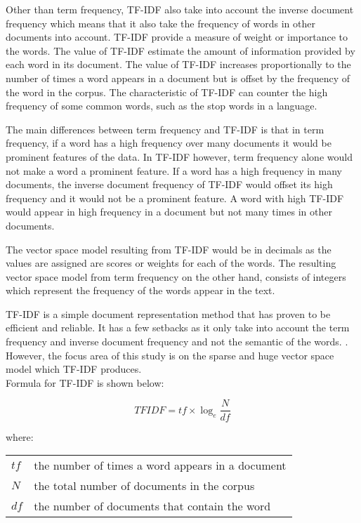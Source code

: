 Other than term frequency, TF-IDF also take into account the inverse document frequency which means that it also take the frequency of words in other documents into account. TF-IDF provide a measure of weight or importance to the words. The value of TF-IDF estimate the amount of information provided by each word in its document. The value of TF-IDF increases proportionally to the number of times a word appears in a document but is offset by the frequency of the word in the corpus. \cite{textMiningTfidf} The characteristic of TF-IDF can counter the high frequency of some common words, such as the stop words in a language. 

The main differences between term frequency and TF-IDF is that in term frequency, if a word has a high frequency over many documents it would be prominent features of the data. In TF-IDF however, term frequency alone would not make a word a prominent feature. If a word has a high frequency in many documents, the inverse document frequency of TF-IDF would offset its high frequency and it would not be a prominent feature. A word with high TF-IDF would appear in high frequency in a document but not many times in other documents. 

The vector space model resulting from TF-IDF would be in decimals as the values are assigned are scores or weights for each of the words. The resulting vector space model from term frequency on the other hand, consists of integers which represent the frequency of the words appear in the text.

TF-IDF is a simple document representation method that has proven to be efficient and reliable. It has a few setbacks as it only take into account the term frequency and inverse document frequency and not the semantic of the words. \cite{tfidfDrawback}. However, the focus area of this study is on the sparse and huge vector space model which TF-IDF produces.\\

Formula for TF-IDF is shown below:

\begin{equation}
TFIDF = tf \times \log_e \frac{N}{df}
\end{equation}
	
where:
	
\begin{center}
\begin{tabular}{l @{ $=$ } l}
	$tf$ & the number of times a word appears in a document \\
	$N$ & the total number of documents in the corpus \\
	$df$ & the number of documents that contain the word
\end{tabular}
\end{center}

